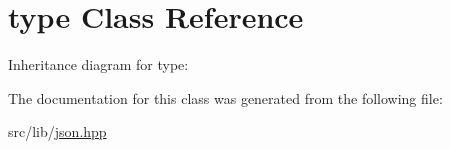 \hypertarget{classstd_1_1conditional_1_1type}{}\section{type Class Reference}
\label{classstd_1_1conditional_1_1type}


Inheritance diagram for type\+:


The documentation for this class was generated from the following file\+:\begin{DoxyCompactItemize}
\item 
src/lib/\hyperlink{json_8hpp}{json.\+hpp}\end{DoxyCompactItemize}
